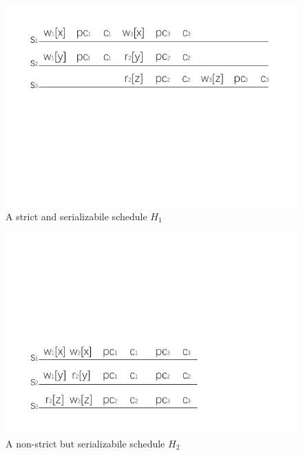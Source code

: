 \documentclass[conference]{IEEEtran}
\begin{document}
\begin{figure}[tbp]
  \centerline{\includegraphics[scale=1]{figure/schedule_strict.pdf}}
  \caption{A strict and serializabile schedule ${H_1}$}
  \label{fig:strict_example}
\end{figure}

\begin{figure}[tbp]
  \centerline{\includegraphics[scale=1]{figure/schedule_non_strict.pdf}}
  \caption{A non-strict but serializabile schedule ${H_2}$}
  \label{fig:non_strict_example}
\end{figure}
\end{document}
